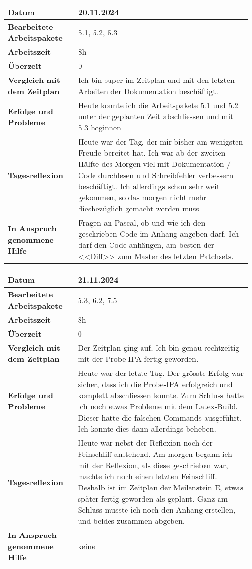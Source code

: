 \begin{longtable}{p{}|p{}}
	\hline
	\textbf{Datum}                       & 20.11.2024 \\
	\hline
	\textbf{Bearbeitete Arbeitspakete}   & 5.1, 5.2, 5.3\\
	\hline
	\textbf{Arbeitszeit}                 & 8h \\
	\hline
	\textbf{Überzeit}                    & 0 \\
	\hline
	\textbf{Vergleich mit dem Zeitplan}  & Ich bin super im Zeitplan und mit den letzten Arbeiten der Dokumentation beschäftigt. \\
	\hline
	\textbf{Erfolge und Probleme}        & Heute konnte ich die Arbeitspakete 5.1 und 5.2 unter der geplanten Zeit abschliessen und mit 5.3 beginnen. 
	\\
	\hline
	\textbf{Tagesreflexion}              & Heute war der Tag, der mir bisher am wenigsten Freude bereitet hat. Ich war ab der zweiten Hälfte des Morgen viel mit Dokumentation / Code durchlesen und Schreibfehler verbessern beschäftigt. Ich allerdings schon sehr weit gekommen, so das morgen nicht mehr diesbezüglich gemacht werden muss.
	\\
	\hline
	\textbf{In Anspruch genommene Hilfe} & Fragen an Pascal, ob und wie ich den geschrieben Code im Anhang angeben darf. Ich darf den Code anhängen, am besten der <<Diff>> zum Master des letzten Patchsets.\\
	\hline
\end{longtable}\label{tab:arbeitsprotokoll-tag9}
\newpage

\begin{longtable}{p{}|p{}}
	\hline
	\textbf{Datum}                       & 21.11.2024 \\
	\hline
	\textbf{Bearbeitete Arbeitspakete}   &  5.3, 6.2, 7.5\\
	\hline
	\textbf{Arbeitszeit}                 & 8h \\
	\hline
	\textbf{Überzeit}                    & 0 \\
	\hline
	\textbf{Vergleich mit dem Zeitplan}  & Der Zeitplan ging auf. Ich bin genau rechtzeitig mit der Probe-IPA fertig geworden.
	\\
	\hline
	\textbf{Erfolge und Probleme}        & Heute war der letzte Tag. Der grösste Erfolg war sicher, dass ich die Probe-IPA erfolgreich und komplett abschliessen konnte. Zum Schluss hatte ich noch etwas Probleme mit dem Latex-Build. Dieser hatte die falschen Commands ausgeführt. Ich konnte dies dann allerdings beheben.
	\\
	\hline
	\textbf{Tagesreflexion}              & Heute war nebst der Reflexion noch der Feinschliff anstehend. Am morgen begann ich mit der Reflexion, als diese geschrieben war, machte ich noch einen letzten Feinschliff. Deshalb ist im Zeitplan der Meilenstein E, etwas später fertig geworden als geplant. Ganz am Schluss musste ich noch den Anhang erstellen, und beides zusammen abgeben.
	\\
	\hline
	\textbf{In Anspruch genommene Hilfe} & keine \\ 
	\hline
\end{longtable}\label{tab:arbeitsprotokoll-tag10}
\newpage


